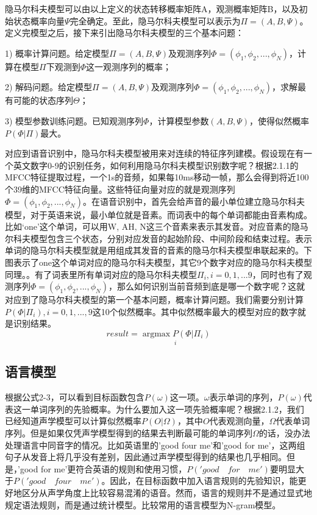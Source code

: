 隐马尔科夫模型可以由以上定义的状态转移概率矩阵A，观测概率矩阵B，以及初始状态概率向量$\Psi$完全确定。至此，隐马尔科夫模型可以表示为$\Pi=(A,B,\Psi)$。定义完模型之后，接下来引出隐马尔科夫模型的三个基本问题：

1) 概率计算问题。给定模型$\Pi=(A,B,\Psi)$及观测序列$\Phi=(\phi_1,\phi_2,...,\phi_N)$，计算在模型$\Pi$下观测到$\Phi$这一观测序列的概率；

2) 解码问题。给定模型$\Pi=(A,B,\Psi)$及观测序列$\Phi=(\phi_1,\phi_2,...,\phi_N)$，求解最有可能的状态序列$\Theta$；

3) 模型参数训练问题。已知观测序列$\Phi$，计算模型参数$(A,B,\Psi)$，使得似然概率$P(\Phi|\Pi)$最大。

对应到语音识别中，隐马尔科夫模型被用来对连续的特征序列建模。假设现在有一个英文数字0-9的识别任务，如何利用隐马尔科夫模型识别数字呢？根据2.1.1的MFCC特征提取过程，一个1s的音频，如果每10ms移动一帧，那么会得到将近100个39维的MFCC特征向量。这些特征向量对应的就是观测序列$\Phi=(\phi_1,\phi_2,...,\phi_N)$。在语音识别中，首先会给声音的最小单位建立隐马尔科夫模型，对于英语来说，最小单位就是音素。而词表中的每个单词都能由音素构成。比如‘one’这个单词，可以用W, AH, N这三个音素来表示其发音。对应音素的隐马尔科夫模型包含三个状态，分别对应发音的起始阶段、中间阶段和结束过程。表示单词的隐马尔科夫模型就是用组成其发音的音素的隐马尔科夫模型串联起来的。下图表示了one这个单词对应的隐马尔科夫模型，其它9个数字对应的隐马尔科夫模型同理。{\color{red}{\large 插入隐马尔科夫模型图片}}。有了词表里所有单词对应的隐马尔科夫模型$\Pi_i,i=0,1,...9$，同时也有了观测序列$\Phi=(\phi_1,\phi_2,...,\phi_N)$，那么如何识别当前音频到底是哪一个数字呢？这就对应到了隐马尔科夫模型的第一个基本问题，概率计算问题。我们需要分别计算$P(\Phi|\Pi_i), i=0,1,...,9$这10个似然概率。其中似然概率最大的模型对应的数字就是识别结果。\begin{equation}result=\underset{i}{\operatorname{argmax} P(\Phi|\Pi_i)} \end{equation}
\subsection{语言模型}
根据公式2-3，可以看到目标函数包含$P(\omega)$这一项。$\omega$表示单词的序列，$P(\omega)$代表这一单词序列的先验概率。为什么要加入这一项先验概率呢？根据2.1.2，我们已经知道声学模型可以计算似然概率$P(O|\Omega)$，其中$O$代表观测向量，$\Omega$代表单词序列。但是如果仅凭声学模型得到的结果去判断最可能的单词序列$\Omega$的话，没办法处理语言中同音字的情况。比如英语里的'good four me'和'good for me'，这两组句子从发音上将几乎没有差别，因此通过声学模型得到的结果也几乎相同。但是，'good for me'更符合英语的规则和使用习惯，$P('good\quad for\quad me')$要明显大于$P('good\quad four\quad me')$。因此，在目标函数中加入语言规则的先验知识，能更好地区分从声学角度上比较容易混淆的语音。然而，语言的规则并不是通过显式地规定语法规则，而是通过统计模型。比较常用的语言模型为N-gram模型。

